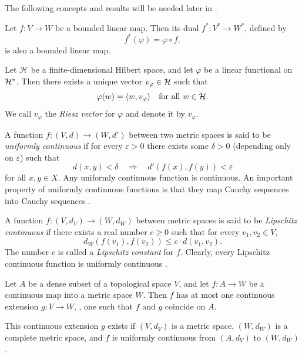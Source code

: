 The following concepts and results will be needed later in .

\begin{proposition} \cite[Proposition 2.3.10]{pedersenAnalysisNow1989}
Let \( f : V \to W \) be a bounded linear map. Then its dual \( f^* : V^* \to W^* \), defined by
\[
f^*(\varphi) = \varphi \circ f,
\]
is also a bounded linear map.
\end{proposition}


\begin{theorem} \cite[Theorem 9.15]{romanAdvancedLinearAlgebra1992}
Let $\mathcal{H}$ be a finite-dimensional Hilbert space, and let $\varphi$ be a linear functional on $\mathcal{H}^*$. Then there exists a unique vector $v_\varphi \in \mathcal{H}$ such that
\[
\varphi(w) = \langle w, v_\varphi \rangle \quad \text{for all } w \in  \mathcal{H}.
\]
We call $v_\varphi$ the \emph{Riesz vector} for $\varphi$ and denote it by $v_\varphi$.\\
\end{theorem}


\begin{definition}\label{def:uni_cont}
  A function \( f : (V, d) \to (W, d') \) between two metric spaces is said to be \emph{uniformly continuous} if for every \( \varepsilon > 0 \) there exists some \( \delta > 0 \) (depending only on \( \varepsilon \)) such that  
\[
d(x, y) < \delta \quad \Rightarrow \quad d'(f(x), f(y)) < \varepsilon
\]
for all \( x, y \in X \).  
Any uniformly continuous function is continuous.  
An important property of uniformly continuous functions is that they map Cauchy sequences into Cauchy sequences \cite{guide2006infinite}. 
\end{definition}

\begin{definition} \label{def:lip_uni_cont}
  A function \( f : (V, d_V) \to (W, d_W) \) between metric spaces is said to be \emph{Lipschitz continuous} if there exists a real number \( c \geq 0 \) such that for every \( v_1, v_2 \in V \),
\[
d_W(f(v_1), f(v_2)) \leq c \cdot d(v_1, v_2).
\]
The number \( c \) is called a \emph{Lipschitz constant} for \( f \).  
Clearly, every Lipschitz continuous function is uniformly continuous  \cite{guide2006infinite}.
\end{definition}

\begin{lemma} \cite[Lemma 7.3.19]{goubault-larrecqNonHausdorffTopologyDomain2013}  \label{lem:completion_unique}
Let \( A \) be a dense subset of a topological space \( V \), and let  
\( f: A \to W \) be a continuous map into a metric space \( W \).  
Then \( f \) has at most one continuous extension \( g: V \to W \), \ie, one such that $f$ and $g$ coincide on $A$.  

This continuous extension \( g \) exists if \( (V,d_V) \) is a metric space, \( (W,d_W) \) is a complete metric space, and \( f \) is uniformly continuous from \( (A,d_V) \) to \( (W,d_W) \). 
\end{lemma}




